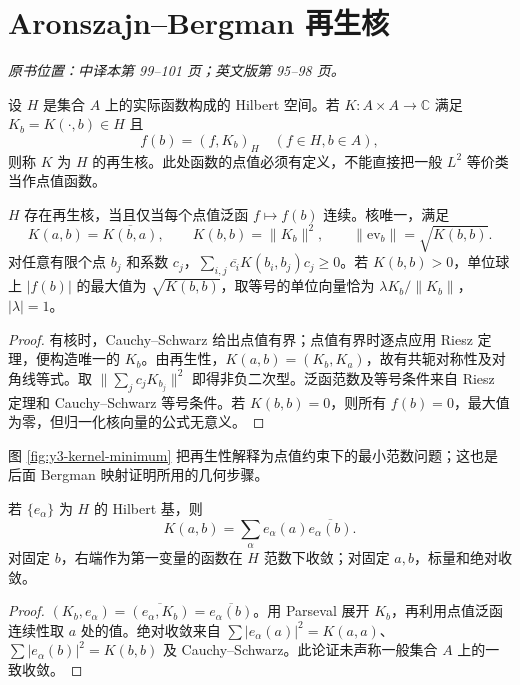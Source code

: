 \section{Aronszajn--Bergman 再生核}\label{sec:yosida-03-09}
\noindent\textit{原书位置：中译本第 99--101 页；英文版第 95--98 页。}

\begin{definition}[再生核]
设 $H$ 是集合 $A$ 上的实际函数构成的 Hilbert 空间。若 $K:A\times A\to\mathbb C$ 满足 $K_b=K(\cdot,b)\in H$ 且
\[
 f(b)=(f,K_b)_H\quad(f\in H,b\in A),
\]
则称 $K$ 为 $H$ 的再生核。此处函数的点值必须有定义，不能直接把一般 $L^2$ 等价类当作点值函数。
\end{definition}

\begin{theorem}[点值连续性刻画再生核]\label{thm:y3-rkhs}
$H$ 存在再生核，当且仅当每个点值泛函 $f\mapsto f(b)$ 连续。核唯一，满足
\[
 K(a,b)=\overline{K(b,a)},\qquad
 K(b,b)=\|K_b\|^2,\qquad \|\mathrm{ev}_b\|=\sqrt{K(b,b)}.
\]
对任意有限个点 $b_j$ 和系数 $c_j$，$\sum_{i,j}\overline{c_i}K(b_i,b_j)c_j\ge0$。若 $K(b,b)>0$，单位球上 $|f(b)|$ 的最大值为 $\sqrt{K(b,b)}$，取等号的单位向量恰为 $\lambda K_b/\|K_b\|$，$|\lambda|=1$。
\end{theorem}
\begin{proof}
有核时，Cauchy--Schwarz 给出点值有界；点值有界时逐点应用 Riesz 定理，便构造唯一的 $K_b$。由再生性，$K(a,b)=(K_b,K_a)$，故有共轭对称性及对角线等式。取 $\|\sum_jc_jK_{b_j}\|^2$ 即得非负二次型。泛函范数及等号条件来自 Riesz 定理和 Cauchy--Schwarz 等号条件。若 $K(b,b)=0$，则所有 $f(b)=0$，最大值为零，但归一化核向量的公式无意义。
\end{proof}

图 \ref{fig:y3-kernel-minimum} 把再生性解释为点值约束下的最小范数问题；这也是后面 Bergman 映射证明所用的几何步骤。



\begin{proposition}[由正交基展开核]\label{prop:y3-kernel-basis}
若 $\{e_\alpha\}$ 为 $H$ 的 Hilbert 基，则
\[
 K(a,b)=\sum_\alpha e_\alpha(a)\overline{e_\alpha(b)}.
\]
对固定 $b$，右端作为第一变量的函数在 $H$ 范数下收敛；对固定 $a,b$，标量和绝对收敛。
\end{proposition}
\begin{proof}
$(K_b,e_\alpha)=\overline{(e_\alpha,K_b)}=\overline{e_\alpha(b)}$。用 Parseval 展开 $K_b$，再利用点值泛函连续性取 $a$ 处的值。绝对收敛来自 $\sum|e_\alpha(a)|^2=K(a,a)$、$\sum|e_\alpha(b)|^2=K(b,b)$ 及 Cauchy--Schwarz。此论证未声称一般集合 $A$ 上的一致收敛。
\end{proof}

